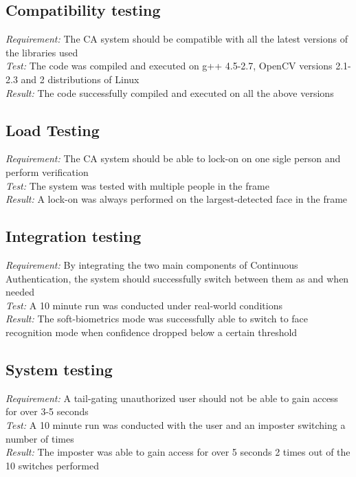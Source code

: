 \documentclass[12pt]{article}			%
\begin{document}
\subsection{ Compatibility testing }
\emph{ Requirement: } The CA system should be compatible with all the latest versions of the libraries used\\
\emph{ Test: } The code was compiled and executed on g++ 4.5-2.7, OpenCV versions 2.1-2.3 and 2 distributions of Linux\\
\emph{ Result: } The code successfully compiled and executed on all the above versions\\

\subsection{ Load Testing }
\emph{ Requirement: } The CA system should be able to lock-on on one sigle person and perform verification \\
\emph{ Test: } The system was tested with multiple people in the frame\\
\emph{ Result: } A lock-on was always performed on the largest-detected face in the frame\\

\subsection{ Integration testing}
\emph{ Requirement: } By integrating the two main components of Continuous Authentication, the system should successfully switch between them as and when needed\\
\emph{ Test: } A 10 minute run was conducted under real-world conditions\\
\emph{ Result: } The soft-biometrics mode was successfully able to switch to face recognition mode when confidence dropped below a certain threshold\\

\subsection{ System testing }
\emph{ Requirement: } A tail-gating unauthorized user should not be able to gain access for over 3-5 seconds\\
\emph{ Test: } A 10 minute run was conducted with the user and an imposter switching a number of times\\
\emph{ Result: } The imposter was able to gain access for over 5 seconds 2 times out of the 10 switches performed\\
\end{document}
